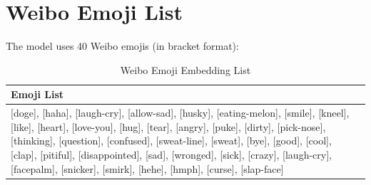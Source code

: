 \documentclass[10pt]{article}
\begin{document}
\section{Weibo Emoji List}
\label{appendix:emoji}

The model uses 40 Weibo emojis (in bracket format):

\begin{table}[H]
\centering
\caption{Weibo Emoji Embedding List}
\label{tab:weibo_emoji}
\begin{tabular}{p{12cm}}
\toprule
\textbf{Emoji List} \\
\midrule
{[}doge{]}, {[}haha{]}, {[}laugh-cry{]}, {[}allow-sad{]}, {[}husky{]}, {[}eating-melon{]}, {[}smile{]}, {[}kneel{]}, {[}like{]}, {[}heart{]}, {[}love-you{]}, {[}hug{]}, {[}tear{]}, {[}angry{]}, {[}puke{]}, {[}dirty{]}, {[}pick-nose{]}, {[}thinking{]}, {[}question{]}, {[}confused{]}, {[}sweat-line{]}, {[}sweat{]}, {[}bye{]}, {[}good{]}, {[}cool{]}, {[}clap{]}, {[}pitiful{]}, {[}disappointed{]}, {[}sad{]}, {[}wronged{]}, {[}sick{]}, {[}crazy{]}, {[}laugh-cry{]}, {[}facepalm{]}, {[}snicker{]}, {[}smirk{]}, {[}hehe{]}, {[}hmph{]}, {[}curse{]}, {[}slap-face{]} \\
\bottomrule
\end{tabular}
\end{table}
\end{document}
